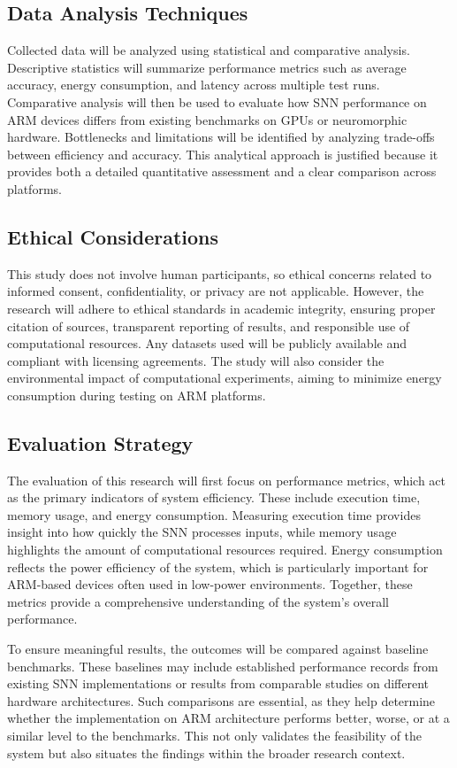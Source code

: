 \documentclass[a4paper,12pt]{article}
\begin{document}
	\subsection{Data Analysis Techniques}
	Collected data will be analyzed using statistical and comparative analysis. Descriptive statistics will summarize performance metrics such as average accuracy, energy consumption, and latency across multiple test runs. Comparative analysis will then be used to evaluate how SNN performance on ARM devices differs from existing benchmarks on GPUs or neuromorphic hardware. Bottlenecks and limitations will be identified by analyzing trade-offs between efficiency and accuracy. This analytical approach is justified because it provides both a detailed quantitative assessment and a clear comparison across platforms.
	
	\subsection{Ethical Considerations}
	This study does not involve human participants, so ethical concerns related to informed consent, confidentiality, or privacy are not applicable. However, the research will adhere to ethical standards in academic integrity, ensuring proper citation of sources, transparent reporting of results, and responsible use of computational resources. Any datasets used will be publicly available and compliant with licensing agreements. The study will also consider the environmental impact of computational experiments, aiming to minimize energy consumption during testing on ARM platforms.
	
	\subsection{Evaluation Strategy}
	The evaluation of this research will first focus on performance metrics, which act as the primary indicators of system efficiency. These include execution time, memory usage, and energy consumption. Measuring execution time provides insight into how quickly the SNN processes inputs, while memory usage highlights the amount of computational resources required. Energy consumption reflects the power efficiency of the system, which is particularly important for ARM-based devices often used in low-power environments. Together, these metrics provide a comprehensive understanding of the system’s overall performance.
	
	To ensure meaningful results, the outcomes will be compared against baseline benchmarks. These baselines may include established performance records from existing SNN implementations or results from comparable studies on different hardware architectures. Such comparisons are essential, as they help determine whether the implementation on ARM architecture performs better, worse, or at a similar level to the benchmarks. This not only validates the feasibility of the system but also situates the findings within the broader research context.
	
\end{document}
